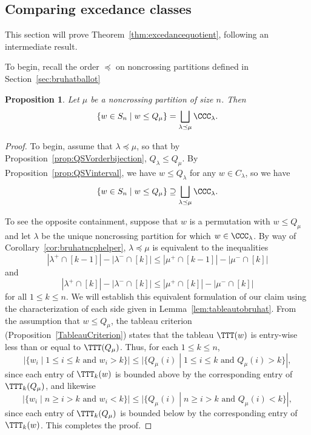 \documentclass[12pt]{article}
\newtheorem{prop}[equation]{Proposition}
\theoremstyle{definition}
\theoremstyle{remark}
\numberwithin{equation}{section}
\begin{document}
\subsection{Comparing excedance classes}
\label{sec:ex3}

This section will prove Theorem~\ref{thm:excedancequotient}, following an intermediate result.

To begin, recall the order $\preceq$ on noncrossing partitions defined in Section~\ref{sec:bruhatballot}

\begin{prop}
\label{prop:Qdominates}
Let $\mu$ be a noncrossing partition of size $n$.  Then
\[
\{w \in S_{n} \;|\; w \le Q_{\mu}\} = \bigsqcup_{\lambda \preceq \mu} \CCC_{\lambda}.
\]
\end{prop}
\begin{proof}
To begin, assume that $\lambda \preceq \mu$, so that by Proposition~\ref{prop:QSVorderbijection}, $Q_{\lambda} \le Q_{\mu}$.  By Proposition~\ref{prop:QSVinterval}, we have $w \le Q_{\lambda}$ for any $w \in C_{\lambda}$, so we have
\[
\{w \in S_{n} \;|\; w \le Q_{\mu}\} \supseteq \bigsqcup_{\lambda \preceq \mu} \CCC_{\lambda}.
\]

To see the opposite containment, suppose that $w$ is a permutation with $w \le Q_{\mu}$ and let $\lambda$ be the unique noncrossing partition for which $w \in \CCC_{\lambda}$.  
By way of Corollary~\ref{cor:bruhatncphelper}, $\lambda \preceq \mu$ is equivalent to the inequalities
\[
|\lambda^{+} \cap [k-1]| - |\lambda^{-} \cap [k]| \le |\mu^{+} \cap [k-1]| - |\mu^{-} \cap [k]|
\]
and
\[
|\lambda^{+} \cap [k]| - |\lambda^{-} \cap [k]| \le |\mu^{+} \cap [k]| - |\mu^{-} \cap [k]|
\]
for all $1 \le k \le n$.  
We will establish this equivalent formulation of our claim using the characterization of each side given in Lemma~\ref{lem:tableautobruhat}.  
From the assumption that $w \le Q_{\mu}$, the tableau criterion (Proposition~\ref{TableauCriterion}) states that the tableau $\TTT(w)$ is entry-wise less than or equal to $\TTT(Q_{\mu})$.  
Thus, for each $1 \le k \le n$, 
\[
|\{w_{i} \;|\; \text{$1 \le i \le k$ and $w_{i} > k$} \}|
\le
|\{Q_{\mu}(i) \;|\; \text{$1 \le i \le k$ and $Q_{\mu}(i) > k$} \}|,
\]
since each entry of $\TTT_{k}(w)$ is bounded above by the corresponding entry of $\TTT_{k}(Q_{\mu})$, and likewise
\[
|\{ w_{i} \;|\; \text{$n \ge i > k$ and $w_{i} < k$} \}| 
\le
|\{ Q_{\mu}(i) \;|\; \text{$n \ge i > k$ and $Q_{\mu}(i) < k$} \}|,
\]
since each entry of $\TTT_{k}(Q_{\mu})$ is bounded below by the corresponding entry of $\TTT_{k}(w)$.  This completes the proof.
\end{proof}
\end{document}
